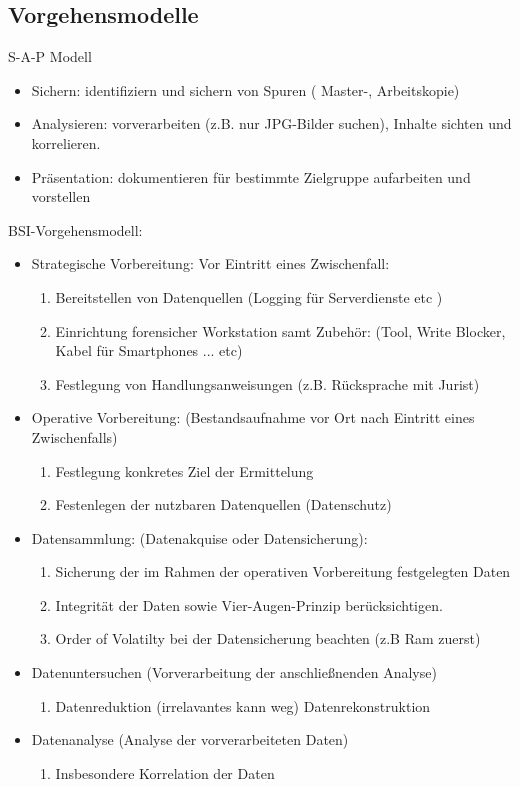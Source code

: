 \documentclass[a4paper,10pt]{scrartcl}
\begin{document}
\subsection{Vorgehensmodelle}
S-A-P Modell
\begin{itemize}
 \item Sichern: identifiziern und sichern von Spuren ( Master-, Arbeitskopie)
 \item Analysieren: vorverarbeiten (z.B. nur JPG-Bilder suchen), Inhalte sichten und korrelieren.
 \item Präsentation: dokumentieren für bestimmte Zielgruppe aufarbeiten und vorstellen
\end{itemize}
BSI-Vorgehensmodell:
\begin{itemize}
 \item Strategische Vorbereitung: Vor Eintritt eines Zwischenfall:
 \begin{enumerate}
  \item Bereitstellen von Datenquellen (Logging für Serverdienste etc )
  \item Einrichtung forensicher Workstation samt Zubehör: (Tool, Write Blocker, Kabel für Smartphones ... etc)
  \item Festlegung von Handlungsanweisungen (z.B. Rücksprache mit Jurist)
 \end{enumerate}
 \item Operative Vorbereitung: (Bestandsaufnahme vor Ort nach Eintritt eines Zwischenfalls)
 \begin{enumerate}
  \item Festlegung konkretes Ziel der Ermittelung
  \item Festenlegen der nutzbaren Datenquellen (Datenschutz)
 \end{enumerate}
 \item Datensammlung: (Datenakquise oder Datensicherung):
  \begin{enumerate}
   \item Sicherung der im Rahmen der operativen Vorbereitung festgelegten Daten
   \item Integrität der Daten sowie Vier-Augen-Prinzip berücksichtigen.
   \item Order of Volatilty bei der Datensicherung beachten (z.B Ram zuerst)
  \end{enumerate}
 \item Datenuntersuchen (Vorverarbeitung der anschließnenden Analyse)
 \begin{enumerate}
  \item Datenreduktion (irrelavantes kann weg)
  \iten Datenrekonstruktion
 \end{enumerate}
 \item Datenanalyse (Analyse der vorverarbeiteten Daten)
 \begin{enumerate}
  \item Insbesondere Korrelation der Daten
 \end{enumerate}


\end{itemize}
\end{document}
